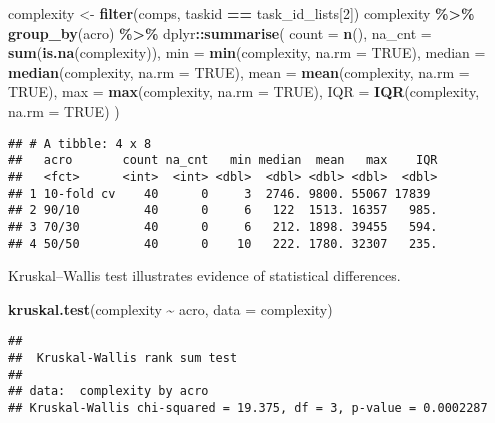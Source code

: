 \documentclass[
]{book}
\newenvironment{Shaded}{\begin{snugshade}}{\end{snugshade}}
\newcommand{\AttributeTok}[1]{\textcolor[rgb]{0.13,0.29,0.53}{#1}}
\newcommand{\ConstantTok}[1]{\textcolor[rgb]{0.56,0.35,0.01}{#1}}
\newcommand{\DecValTok}[1]{\textcolor[rgb]{0.00,0.00,0.81}{#1}}
\newcommand{\FunctionTok}[1]{\textcolor[rgb]{0.13,0.29,0.53}{\textbf{#1}}}
\newcommand{\NormalTok}[1]{#1}
\newcommand{\OtherTok}[1]{\textcolor[rgb]{0.56,0.35,0.01}{#1}}
\newcommand{\SpecialCharTok}[1]{\textcolor[rgb]{0.81,0.36,0.00}{\textbf{#1}}}
\begin{document}
\begin{Shaded}
\begin{Highlighting}[]
\NormalTok{complexity }\OtherTok{\textless{}{-}} \FunctionTok{filter}\NormalTok{(comps, taskid }\SpecialCharTok{==}\NormalTok{ task\_id\_lists[}\DecValTok{2}\NormalTok{])}
\NormalTok{complexity }\SpecialCharTok{\%\textgreater{}\%}
  \FunctionTok{group\_by}\NormalTok{(acro) }\SpecialCharTok{\%\textgreater{}\%}
\NormalTok{  dplyr}\SpecialCharTok{::}\FunctionTok{summarise}\NormalTok{(}
    \AttributeTok{count =} \FunctionTok{n}\NormalTok{(),}
    \AttributeTok{na\_cnt =} \FunctionTok{sum}\NormalTok{(}\FunctionTok{is.na}\NormalTok{(complexity)),}
    \AttributeTok{min =} \FunctionTok{min}\NormalTok{(complexity, }\AttributeTok{na.rm =} \ConstantTok{TRUE}\NormalTok{),}
    \AttributeTok{median =} \FunctionTok{median}\NormalTok{(complexity, }\AttributeTok{na.rm =} \ConstantTok{TRUE}\NormalTok{),}
    \AttributeTok{mean =} \FunctionTok{mean}\NormalTok{(complexity, }\AttributeTok{na.rm =} \ConstantTok{TRUE}\NormalTok{),}
    \AttributeTok{max =} \FunctionTok{max}\NormalTok{(complexity, }\AttributeTok{na.rm =} \ConstantTok{TRUE}\NormalTok{),}
    \AttributeTok{IQR =} \FunctionTok{IQR}\NormalTok{(complexity, }\AttributeTok{na.rm =} \ConstantTok{TRUE}\NormalTok{)}
\NormalTok{  )}
\end{Highlighting}
\end{Shaded}

\begin{verbatim}
## # A tibble: 4 x 8
##   acro       count na_cnt   min median  mean   max    IQR
##   <fct>      <int>  <int> <dbl>  <dbl> <dbl> <dbl>  <dbl>
## 1 10-fold cv    40      0     3  2746. 9800. 55067 17839 
## 2 90/10         40      0     6   122  1513. 16357   985.
## 3 70/30         40      0     6   212. 1898. 39455   594.
## 4 50/50         40      0    10   222. 1780. 32307   235.
\end{verbatim}

Kruskal--Wallis test illustrates evidence of statistical differences.

\begin{Shaded}
\begin{Highlighting}[]
\FunctionTok{kruskal.test}\NormalTok{(complexity }\SpecialCharTok{\textasciitilde{}}\NormalTok{ acro, }\AttributeTok{data =}\NormalTok{ complexity)}
\end{Highlighting}
\end{Shaded}

\begin{verbatim}
## 
##  Kruskal-Wallis rank sum test
## 
## data:  complexity by acro
## Kruskal-Wallis chi-squared = 19.375, df = 3, p-value = 0.0002287
\end{verbatim}
\end{document}
